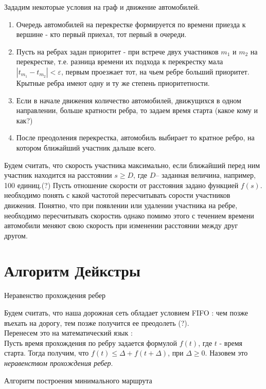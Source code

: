 \documentclass[12pt, a4paper]{article}
\begin{document}
Зададим некоторые условия на граф и движение автомобилей. 

\begin{enumerate}
	\item Очередь автомобилей на перекрестке формируется по времени приезда к вершине - кто первый приехал, тот первый в очереди.
	\item Пусть на ребрах задан приоритет - при встрече двух участников $ m_1 $ и $ m_2 $ на перекрестке, т.е. разница времени их подхода к перекрестку мала $ | t_{m_1} - t_{m_2} | < \varepsilon $, первым проезжает тот, на чьем ребре больший приоритет. Крытные ребра имеют одну и ту же степень приоритетности. 
	\item Если в начале движения количество автомобилей, движущихся в одном направлении, больше кратности ребра, то задаем время старта (какое кому и как?)
	\item После преодоления перекрестка, автомобиль выбирает то кратное ребро, на котором ближайший участник дальше всего.
\end{enumerate}

Будем считать, что скорость участника максимально, если ближайший перед ним участник находится на расстоянии $ s \geq D $, где $ D $-- заданная величина, например, 100 единиц.(?) Пусть отношение скорости от расстояния задано функцией $ f(s) $. необходимо понять с какой частотой пересчитывать сорости участников движения. Понятно, что при появлении или удалении участника на ребре, необходимо пересчитывать скоростиь однако помимо этого с течением времени автомобили меняют свою скорость при изменении расстоянии между друг другом.




\newpage
\section*{Алгоритм Дейкстры}

$\textbf{Неравенство прохождения ребер}$

Будем считать, что наша дорожная сеть обладает условием FIFO : чем позже въехать на дорогу, тем позже получится ее преодолеть (?).\\
Перенесем это на математический язык : \\
Пусть время прохождения по ребру задается формулой $f(t)$, где $t$ - время старта. Тогда получим, что $f(t) \le \Delta + f(t + \Delta)$, при $\Delta \ge 0$. Назовем это \textit{неравенством прохождения ребер}.


$\textbf{Алгоритм построения минимального маршрута}$
\end{document}
